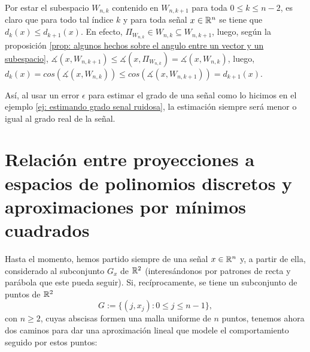 \begin{nota}
Por estar el subespacio $W_{n,k}$ contenido en 
$W_{n,k+1}$ para toda $0 \leq k \leq n-2$, es claro que 
para todo tal índice $k$ y para toda señal $x \in \mathbb{R}^{n}$ se tiene
que $d_{k}(x) \leq d_{k+1}(x)$. En efecto,
$\Pi_{W_{n,k}} \in W_{n, k} \subseteq W_{n, k+1}$, luego, según 
la proposición \ref{prop: algunos hechos sobre el angulo entre un vector y un subespacio},
$\measuredangle(x, W_{n, k+1}) \leq 
\measuredangle(x, \Pi_{W_{n,k}})
= \measuredangle(x, W_{n, k})$, luego, 
$d_{k}(x) = cos(\measuredangle(x, W_{n, k})) \leq 
cos( \measuredangle(x, W_{n, k+1}) ) = d_{k+1}(x)$.

Así, al usar un error $\epsilon$ para estimar el grado
de una señal como lo hicimos en el ejemplo 
\ref{ej: estimando grado senal ruidosa},
la estimación siempre será menor o igual al grado real de la señal.
\end{nota}



\section{Relación entre proyecciones a espacios de polinomios discretos y aproximaciones por mínimos cuadrados}
\label{Relación entre proyecciones a espacios de polinomios discretos y aproximaciones por mínimos cuadrados}

Hasta el momento, hemos partido siempre
de una señal $x \in \mathbb{R}^{n}$
y, a partir de ella, considerado al subconjunto $G_{x}$ 
de $\mathbb{R}^{2}$ (interesándonos por patrones de 
recta y parábola que este pueda seguir).
Si, recíprocamente, se tiene un 
subconjunto de puntos de $\mathbb{R}^{2}$ 
\begin{equation}
\label{eq: Halloween!}
G:=\{(j, x_{j}): 0 \leq j \leq n-1 \},
\end{equation}
con $n \geq 2$,
cuyas abscisas formen una malla uniforme
de $n$ puntos, tenemos ahora dos caminos
para dar una aproximación lineal
que modele el comportamiento 
seguido por estos puntos:

